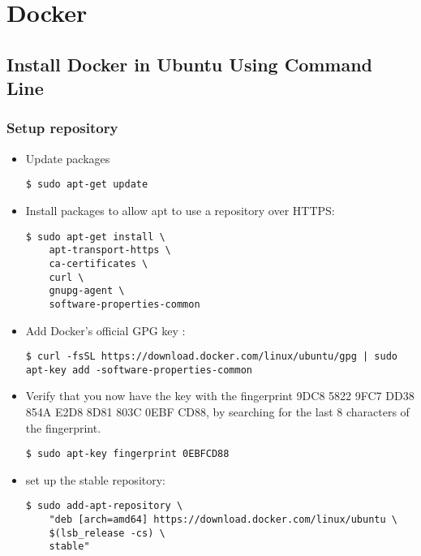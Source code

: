 \chapter{Docker}
  
\section{Install Docker in Ubuntu Using Command Line}	
  	
  
\subsection{Setup repository}
\begin{itemize}
\item Update packages 
	
\begin{verbatim}
$ sudo apt-get update
\end{verbatim}

\item Install packages to allow apt to use a repository over HTTPS:

\begin{verbatim}
$ sudo apt-get install \
	apt-transport-https \
	ca-certificates \
	curl \
	gnupg-agent \
	software-properties-common
\end{verbatim}

\item Add Docker’s official GPG key :
\begin{verbatim}
$ curl -fsSL https://download.docker.com/linux/ubuntu/gpg | sudo apt-key add -software-properties-common
\end{verbatim}


\item Verify that you now have the key with the fingerprint 9DC8 5822 9FC7 DD38 854A E2D8 8D81 803C 0EBF CD88, by searching for the last 8 characters of the fingerprint.
\begin{verbatim}
$ sudo apt-key fingerprint 0EBFCD88
\end{verbatim}


\item set up the stable repository:
\begin{verbatim}
$ sudo add-apt-repository \
	"deb [arch=amd64] https://download.docker.com/linux/ubuntu \
	$(lsb_release -cs) \
	stable"
\end{verbatim}

\end{itemize}

